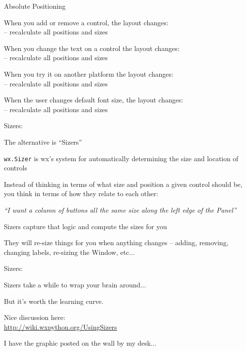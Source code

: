 \documentclass{beamer}
\begin{document}
\begin{frame}[fragile]{Absolute Positioning}

{\Large When you add or remove a control, the layout changes:}\\
{\large -- recalculate all positions and sizes}

\vfill
{\Large When you change the text  on a control the layout changes:}\\
{\large -- recalculate all positions and sizes}

\vfill
{\Large When you try it on another platform the layout changes:}\\
{\large -- recalculate all positions and sizes}

\vfill
{\Large When the user changes default font size, the layout changes:}\\
{\large -- recalculate all positions and sizes}

\end{frame}

\begin{frame}[fragile]{Sizers:}

{\Large The alternative is ``Sizers''}

\vfill
{\large \verb`wx.Sizer` is wx's system for automatically determining the size and location of controls}

\vfill
{\large Instead of thinking in terms of what size and position a given control should be, you think in terms of how they relate to each other:}

\vfill
{\large \emph{``I want a column of buttons all the same size along the left edge of the Panel''} }

\vfill
{\large Sizers capture that logic and compute the sizes for you}

\vfill
{\large They will re-size things for you when anything changes -- adding, removing, changing labels, re-sizing the Window, etc...}

\end{frame}


\begin{frame}[fragile]{Sizers:}

{\Large Sizers take a while to wrap your brain around...}

\vfill
{\Large But it's worth the learning curve.}


\vfill
{\Large Nice discussion here:\\
\url{http://wiki.wxpython.org/UsingSizers} }

\vfill
{\large I have the graphic posted on the wall by my desk...}

\end{frame}
\end{document}
